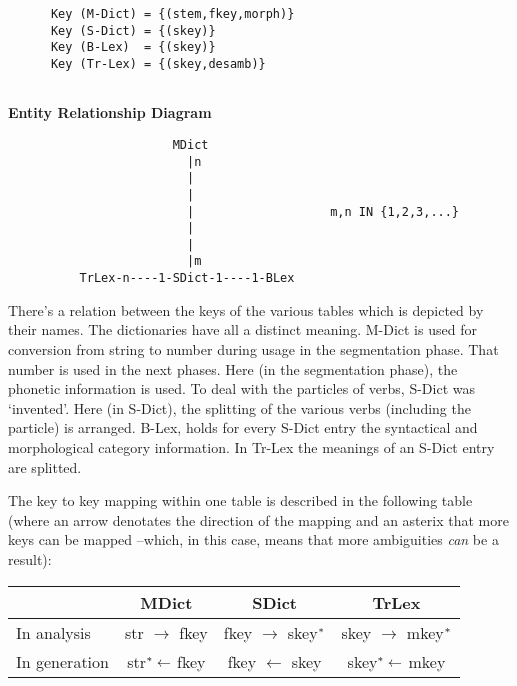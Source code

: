 \begin{verbatim}      
      Key (M-Dict) = {(stem,fkey,morph)}
      Key (S-Dict) = {(skey)}
      Key (B-Lex)  = {(skey)}
      Key (Tr-Lex) = {(skey,desamb)}
      
\end{verbatim}
{\bf Entity Relationship Diagram}

\begin{verbatim}      
                       MDict
                         |n 
                         |
                         |
                         |                   m,n IN {1,2,3,...}
                         |
                         |
                         |m
          TrLex-n----1-SDict-1----1-BLex
\end{verbatim}      

There's a relation between the keys of the various tables which is depicted by 
their names. The dictionaries have all a distinct meaning. M-Dict is used for 
conversion from string to number during usage in the segmentation phase. That 
number is used in the next phases. Here (in the segmentation phase), the 
phonetic information is used. To deal with the particles of verbs, S-Dict
was `invented'. Here (in S-Dict), the splitting of the various verbs (including 
the particle) is arranged. B-Lex, holds for every S-Dict entry the syntactical 
and morphological category information. In Tr-Lex the meanings of an S-Dict 
entry are splitted. 

The key to key mapping within one table is described in the following table 
(where an arrow denotates the direction of the mapping and an asterix 
that more keys can be mapped --which, in this case, means that more ambiguities
{\em can} be a result): 

\begin{center}
 \begin{tabular}{|l||c|c|c|}\hline
               & MDict                      
                       & SDict                          
                                & TrLex                                \\ \hline
 In analysis   & str $\rightarrow$ fkey     
                       & fkey $\rightarrow$ skey$^{\bf \ast}$ 
                                & skey $\rightarrow$ mkey$^{\bf \ast}$ \\
 In generation & str$^{\bf \ast} \leftarrow$ fkey 
                       & fkey $\leftarrow$ skey  
                                & skey$^{\bf \ast} \leftarrow$ mkey    \\ \hline
\end{tabular}
\end{center}

